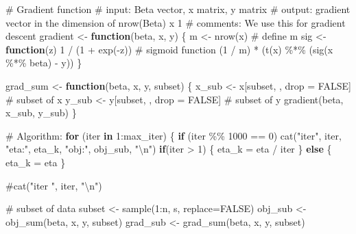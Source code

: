 \documentclass[
  letterpaper,
  DIV=11,
  numbers=noendperiod]{scrartcl}
\newenvironment{Shaded}{\begin{snugshade}}{\end{snugshade}}
\newcommand{\AttributeTok}[1]{\textcolor[rgb]{0.40,0.45,0.13}{#1}}
\newcommand{\CommentTok}[1]{\textcolor[rgb]{0.37,0.37,0.37}{#1}}
\newcommand{\ConstantTok}[1]{\textcolor[rgb]{0.56,0.35,0.01}{#1}}
\newcommand{\ControlFlowTok}[1]{\textcolor[rgb]{0.00,0.23,0.31}{\textbf{#1}}}
\newcommand{\DecValTok}[1]{\textcolor[rgb]{0.68,0.00,0.00}{#1}}
\newcommand{\FunctionTok}[1]{\textcolor[rgb]{0.28,0.35,0.67}{#1}}
\newcommand{\NormalTok}[1]{\textcolor[rgb]{0.00,0.23,0.31}{#1}}
\newcommand{\OtherTok}[1]{\textcolor[rgb]{0.00,0.23,0.31}{#1}}
\newcommand{\SpecialCharTok}[1]{\textcolor[rgb]{0.37,0.37,0.37}{#1}}
\newcommand{\StringTok}[1]{\textcolor[rgb]{0.13,0.47,0.30}{#1}}
\begin{document}
\begin{Shaded}
\begin{Highlighting}[]
  \CommentTok{\# Gradient function}
  \CommentTok{\# input: Beta vector, x matrix, y matrix}
  \CommentTok{\# output: gradient vector in the dimension of nrow(Beta) x 1}
  \CommentTok{\# comments: We use this for gradient descent}
\NormalTok{  gradient }\OtherTok{\textless{}{-}} \ControlFlowTok{function}\NormalTok{(beta, x, y) \{}
\NormalTok{    m }\OtherTok{\textless{}{-}} \FunctionTok{nrow}\NormalTok{(x)                       }\CommentTok{\# define m}
\NormalTok{    sig }\OtherTok{\textless{}{-}} \ControlFlowTok{function}\NormalTok{(z) }\DecValTok{1} \SpecialCharTok{/}\NormalTok{ (}\DecValTok{1} \SpecialCharTok{+} \FunctionTok{exp}\NormalTok{(}\SpecialCharTok{{-}}\NormalTok{z))  }\CommentTok{\# sigmoid function}
\NormalTok{    (}\DecValTok{1} \SpecialCharTok{/}\NormalTok{ m) }\SpecialCharTok{*}\NormalTok{ (}\FunctionTok{t}\NormalTok{(x) }\SpecialCharTok{\%*\%}\NormalTok{ (}\FunctionTok{sig}\NormalTok{(x }\SpecialCharTok{\%*\%}\NormalTok{ beta) }\SpecialCharTok{{-}}\NormalTok{ y))}
\NormalTok{  \}}
  
\NormalTok{  grad\_sum }\OtherTok{\textless{}{-}} \ControlFlowTok{function}\NormalTok{(beta, x, y, subset) \{}
\NormalTok{    x\_sub }\OtherTok{\textless{}{-}}\NormalTok{ x[subset, , drop }\OtherTok{=} \ConstantTok{FALSE}\NormalTok{]   }\CommentTok{\# subset of x}
\NormalTok{    y\_sub }\OtherTok{\textless{}{-}}\NormalTok{ y[subset, , drop }\OtherTok{=} \ConstantTok{FALSE}\NormalTok{]   }\CommentTok{\# subset of y}
    \FunctionTok{gradient}\NormalTok{(beta, x\_sub, y\_sub)}
\NormalTok{  \}}

  \CommentTok{\# Algorithm:}
  \ControlFlowTok{for}\NormalTok{ (iter }\ControlFlowTok{in} \DecValTok{1}\SpecialCharTok{:}\NormalTok{max\_iter) \{}
    \ControlFlowTok{if}\NormalTok{ (iter }\SpecialCharTok{\%\%} \DecValTok{1000} \SpecialCharTok{==} \DecValTok{0}\NormalTok{) }\FunctionTok{cat}\NormalTok{(}\StringTok{"iter"}\NormalTok{, iter, }\StringTok{"eta:"}\NormalTok{, eta\_k, }\StringTok{"obj:"}\NormalTok{, obj\_sub, }\StringTok{"}\SpecialCharTok{\textbackslash{}n}\StringTok{"}\NormalTok{)}
    \ControlFlowTok{if}\NormalTok{(iter }\SpecialCharTok{\textgreater{}} \DecValTok{1}\NormalTok{) \{}
\NormalTok{      eta\_k }\OtherTok{=}\NormalTok{ eta }\SpecialCharTok{/}\NormalTok{ iter}
\NormalTok{    \} }\ControlFlowTok{else}\NormalTok{ \{}
\NormalTok{      eta\_k }\OtherTok{=}\NormalTok{ eta}
\NormalTok{    \}}
    
    \CommentTok{\#cat("iter ", iter, "\textbackslash{}n")}
    
    \CommentTok{\# subset of data}
\NormalTok{    subset }\OtherTok{\textless{}{-}} \FunctionTok{sample}\NormalTok{(}\DecValTok{1}\SpecialCharTok{:}\NormalTok{n, s, }\AttributeTok{replace=}\ConstantTok{FALSE}\NormalTok{)}
\NormalTok{    obj\_sub }\OtherTok{\textless{}{-}} \FunctionTok{obj\_sum}\NormalTok{(beta, x, y, subset)}
\NormalTok{    grad\_sub }\OtherTok{\textless{}{-}} \FunctionTok{grad\_sum}\NormalTok{(beta, x, y, subset)}
    

\end{Highlighting}
\end{Shaded}
\end{document}
